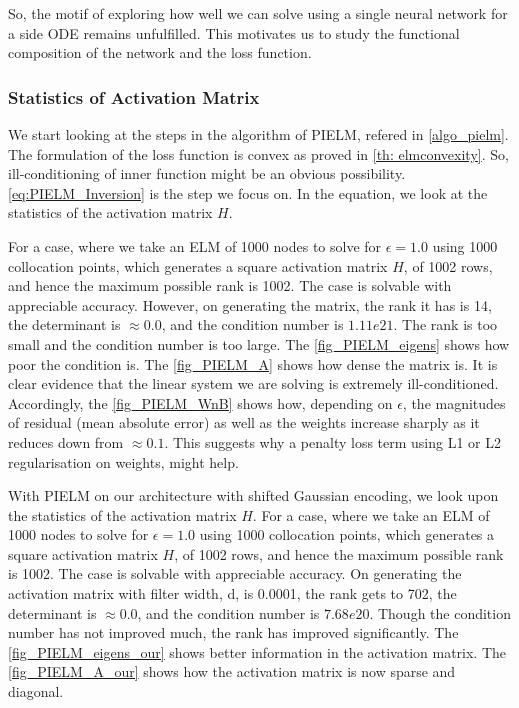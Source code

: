 \documentclass{article}
\begin{document}
So, the motif of exploring how well we can solve using a single neural network for a side ODE remains unfulfilled. This motivates us to study the functional composition of the network and the loss function. 

\subsubsection{Statistics of Activation Matrix}
We start looking at the steps in the algorithm of PIELM, refered in \cref{algo_pielm}. The formulation of the loss function is convex as proved in \cref{th: elmconvexity}. So, ill-conditioning of inner function might be an obvious possibility. \cref{eq:PIELM_Inversion} is the step we focus on. In the equation, we look at the statistics of the activation matrix $H$.

For a case, where we take an ELM of 1000 nodes to solve for $\epsilon = 1.0$ using 1000 collocation points, which generates a square activation matrix $H$, of 1002 rows, and hence the maximum possible rank is 1002. The case is solvable with appreciable accuracy. However, on generating the matrix, the rank it has is 14, the determinant is $\approx 0.0$, and the condition number is $1.11e21$. The rank is too small and the condition number is too large. The \cref{fig_PIELM_eigens} shows how poor the condition is. The \cref{fig_PIELM_A} shows how dense the matrix is. It is clear evidence that the linear system we are solving is extremely ill-conditioned. Accordingly, the \cref{fig_PIELM_WnB} shows how, depending on $\epsilon$, the magnitudes of residual (mean absolute error) as well as the weights increase sharply as it reduces down from $\approx 0.1$. This suggests why a penalty loss term using L1 or L2 regularisation on weights, might help. 

With PIELM on our architecture with shifted Gaussian encoding, we look upon the statistics of the activation matrix $H$. For a case, where we take an ELM of 1000 nodes to solve for $\epsilon=1.0$ using 1000 collocation points, which generates a square activation matrix $H$, of 1002 rows, and hence the maximum possible rank is 1002. The case is solvable with appreciable accuracy. On generating the activation matrix with filter width, d, is 0.0001, the rank gets to 702, the determinant is $\approx 0.0$, and the condition number is $7.68e20$. Though the condition number has not improved much, the rank has improved significantly. The \cref{fig_PIELM_eigens_our} shows better information in the activation matrix. The \cref{fig_PIELM_A_our} shows how the activation matrix is now sparse and diagonal.
\end{document}
